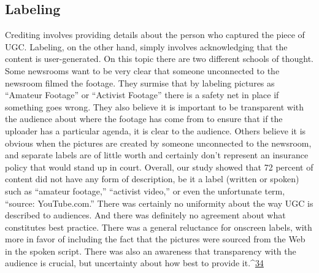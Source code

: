\begin{enumerate}
\chapter{Labeling}
Crediting involves providing details about the person who captured the
piece of UGC. Labeling, on the other hand, simply involves acknowledging
that the content is user-generated. On this topic there are two different
schools of thought. Some newsrooms want to be very clear that someone
unconnected to the newsroom filmed the footage. They surmise that by
labeling pictures as ``Amateur Footage'' or ``Activist Footage'' there is a safety
net in place if something goes wrong. They also believe it is important to
be transparent with the audience about where the footage has come from
to ensure that if the uploader has a particular agenda, it is clear to the audience.
Others believe it is obvious when the pictures are created by someone
unconnected to the newsroom, and separate labels are of little worth and
certainly don't represent an insurance policy that would stand up in court.
Overall, our study showed that 72 percent of content did not have any form
of description, be it a label (written or spoken) such as ``amateur footage,''
``activist video,'' or even the unfortunate term, ``source: YouTube.com.'' There
was certainly no uniformity about the way UGC is described to audiences.
And there was definitely no agreement about what constitutes best practice.
There was a general reluctance for onscreen labels, with more in favor of
including the fact that the pictures were sourced from the Web in the spoken
script. There was also an awareness that transparency with the audience
is crucial, but uncertainty about how best to provide it.^{\href{#endnotes}{34}}


\end{enumerate}
